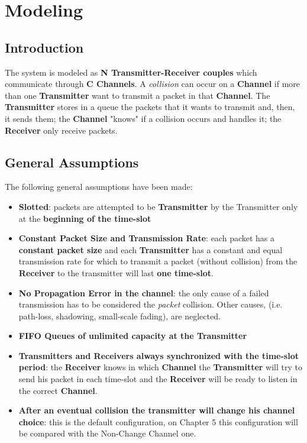 \section{Modeling}
\subsection{Introduction}
The system is modeled as \textbf{N Transmitter-Receiver couples} which communicate through \textbf{C Channels}. A \textit{collision} can occur on a \textbf{Channel} if more than one \textbf{Transmitter} want to transmit a packet in that \textbf{Channel}. The \textbf{Transmitter} stores in a queue the packets that it wants to transmit and, then, it sends them; the \textbf{Channel} "knows" if a collision occurs and handles it; the \textbf{Receiver} only receive packets.  
\subsection{General Assumptions}
The following general assumptions have been made:
\begin{itemize}
	\item \textbf{Slotted}: packets are attempted to be \textbf{Transmitter} by the Transmitter only at the \textbf{beginning of the time-slot}
	\item \textbf{Constant Packet Size and Transmission Rate}: each packet has a \textbf{constant packet size} and each \textbf{Transmitter} has a constant and equal transmission rate for which to transmit a packet (without collision) from the \textbf{Receiver} to the transmitter will last \textbf{one time-slot}.
	\item \textbf{No Propagation Error in the channel}: the only cause of a failed transmission has to be considered the \textit{packet} collision. Other causes, (i.e. path-loss, shadowing, small-scale fading), are neglected. 
	\item \textbf{FIFO Queues of unlimited capacity at the Transmitter} 
	\item \textbf{Transmitters and Receivers always synchronized with the time-slot period}: the \textbf{Receiver} knows in which \textbf{Channel} the \textbf{Transmitter} will try to send his packet in each time-slot and the \textbf{Receiver} will be ready to listen in the correct \textbf{Channel}.
	\item \textbf{After an eventual collision the transmitter will change his channel choice}: this is the default configuration, on Chapter 5 this configuration will be compared with the Non-Change Channel one.
\end{itemize}

